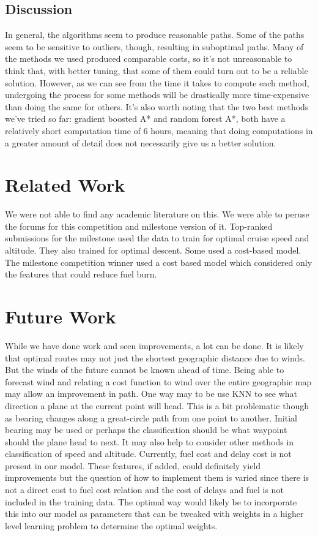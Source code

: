 \documentclass{article}[12pt]
\begin{document}
\begin{multicols}{2}
\subsection{Discussion}
In general, the algorithms seem to produce reasonable paths. Some of the paths seem to be sensitive to outliers, though, resulting in suboptimal paths. Many of the methods we used produced comparable costs, so it's not unreasonable to think that, with better tuning, that some of them could turn out to be a reliable solution. However, as we can see from the time it takes to compute each method, undergoing the process for some methods will be drastically more time-expensive than doing the same for others. It's also worth noting that the two best methods we've tried so far: gradient boosted A* and random forest A*, both have a relatively short computation time of 6 hours, meaning that doing computations in a greater amount of detail does not necessarily give us a better solution.  

\section{Related Work}
We were not able to find any academic literature on this. We were able to peruse the forums for this competition and milestone version of it. Top-ranked submissions for the milestone used the data to train for optimal cruise speed and altitude. They also trained for optimal descent. Some used a cost-based model. The milestone competition winner used a cost based model which considered only the features that could reduce fuel burn. 

\section{Future Work}
While we have done work and seen improvements, a lot can be done. It is likely that optimal routes may not just the shortest geographic distance due to winds. But the winds of the future cannot be known ahead of time. Being able to forecast wind and relating a cost function to wind over the entire geographic map may allow an improvement in path. One way may to be use KNN to see what direction a plane at the current point will head. This is a bit problematic though as bearing changes along a great-circle path from one point to another. Initial bearing may be used or perhaps the classification should be what waypoint should the plane head to next. It may also help to consider other methods in classification of speed and altitude. Currently, fuel cost and delay cost is not present in our model. These features, if added, could definitely yield improvements but the question of how to implement them is varied since there is not a direct cost to fuel cost relation and the cost of delays and fuel is not included in the training data. The optimal way would likely be to incorporate this into our model as parameters that can be tweaked with weights in a higher level learning problem to determine the optimal weights. \\


\end{multicols}
\end{document}
